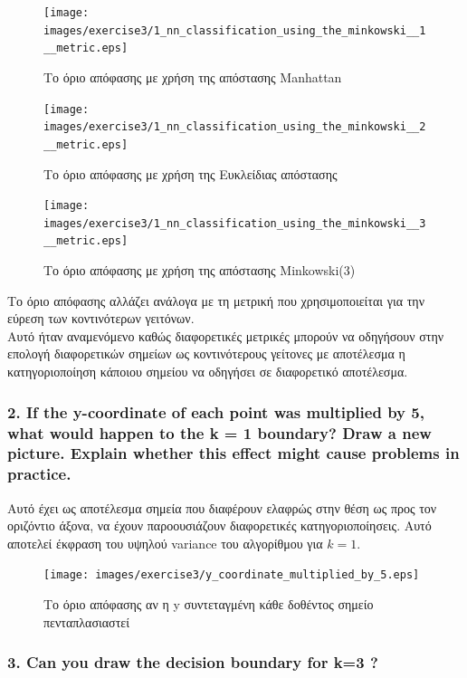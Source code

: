 \documentclass[12pt]{article}
\newenvironment{matlab}
	{\begin{figure}[H]\centering\captionsetup{justification=centering}}
	{\end{figure}}
\begin{document}
\begin{matlab}
    \texttt{[image: images/exercise3/1\_nn\_classification\_using\_the\_minkowski\_\_1\_\_metric.eps]}
    \caption{Το όριο απόφασης με χρήση της απόστασης Manhattan}
\end{matlab}

\begin{matlab}
    \texttt{[image: images/exercise3/1\_nn\_classification\_using\_the\_minkowski\_\_2\_\_metric.eps]}
    \caption{Το όριο απόφασης με χρήση της Ευκλείδιας απόστασης}
\end{matlab}

\begin{matlab}
    \texttt{[image: images/exercise3/1\_nn\_classification\_using\_the\_minkowski\_\_3\_\_metric.eps]}
    \caption{Το όριο απόφασης με χρήση της απόστασης Minkowski(3)}
\end{matlab}

Το όριο απόφασης αλλάζει ανάλογα με τη μετρική που
χρησιμοποιείται για την εύρεση των κοντινότερων γειτόνων. \\

Αυτό ήταν αναμενόμενο καθώς διαφορετικές μετρικές μπορούν
να οδηγήσουν στην επολογή διαφορετικών σημείων ως κοντινότερους
γείτονες με αποτέλεσμα η κατηγοριοποίηση κάποιου σημείου
να οδηγήσει σε διαφορετικό αποτέλεσμα. \\

\pagebreak

\subsubsection*{2. If the y-coordinate of each point was multiplied by 5, what would happen to the k =
	1 boundary? Draw a new picture. Explain whether this effect might cause problems in
	practice.}

Αυτό έχει ως αποτέλεσμα σημεία που διαφέρουν ελαφρώς στην θέση
ως προς τον οριζόντιο άξονα, να έχουν παροουσιάζουν διαφορετικές
κατηγοριοποίησεις. Αυτό αποτελεί έκφραση του υψηλού variance του
αλγορίθμου για \( k = 1 \).

\begin{matlab}
    \texttt{[image: images/exercise3/y\_coordinate\_multiplied\_by\_5.eps]}
    \caption{Το όριο απόφασης αν η y συντεταγμένη κάθε δοθέντος σημείο πενταπλασιαστεί}
\end{matlab}

\pagebreak

\subsubsection*{3. Can you draw the decision boundary for k=3 ?}
\end{document}
